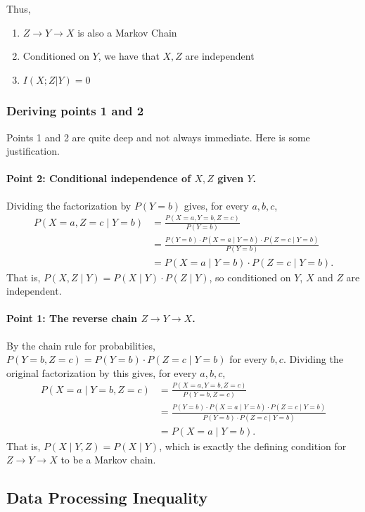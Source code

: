 \documentclass{article}
\begin{document}
Thus,
\begin{enumerate}
    \item $Z\to Y\to X$ is also a Markov Chain 
    \item Conditioned on $Y$, we have that $X,Z$ are independent
    \item $I(X;Z|Y)=0$
\end{enumerate}

\subsubsection{Deriving points 1 and 2}

Points 1 and 2 are quite deep and not always immediate. Here is some justification.

\paragraph{Point 2: Conditional independence of $X,Z$ given $Y$.}
Dividing the factorization by $P(Y=b)$ gives, for every $a,b,c$,
\begin{align*}
P(X=a,Z=c\mid Y=b) &= \frac{P(X=a,Y=b,Z=c)}{P(Y=b)} \\
&= \frac{P(Y=b)\cdot P(X=a\mid Y=b)\cdot P(Z=c\mid Y=b)}{P(Y=b)} \\
&= P(X=a\mid Y=b)\cdot P(Z=c\mid Y=b).
\end{align*}
That is, $P(X,Z\mid Y) = P(X\mid Y)\cdot P(Z\mid Y)$, so conditioned on $Y$, $X$ and $Z$ are independent.

\paragraph{Point 1: The reverse chain $Z\to Y \to X$.}
By the chain rule for probabilities, $P(Y=b,Z=c) = P(Y=b)\cdot P(Z=c\mid Y=b)$
for every $b,c$. Dividing the original factorization by this gives, for every $a,b,c$,
\begin{align*}
P(X=a\mid Y=b,Z=c) &= \frac{P(X=a,Y=b,Z=c)}{P(Y=b,Z=c)} \\
&= \frac{P(Y=b)\cdot P(X=a\mid Y=b)\cdot P(Z=c\mid Y=b)}{P(Y=b)\cdot P(Z=c\mid Y=b)} \\
&= P(X=a\mid Y=b).
\end{align*}
That is, $P(X\mid Y,Z) = P(X\mid Y)$, which is exactly the defining condition for $Z\to Y\to X$ to be a Markov chain.

\subsection{Data Processing Inequality}
\end{document}
